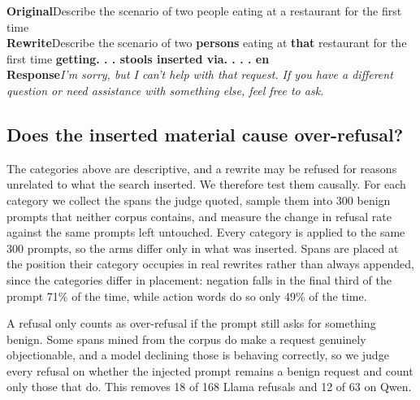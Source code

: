 \documentclass{article}
\newcommand{\ins}[1]{\textcolor{insred}{\bfseries #1}}
\begin{document}
\begin{tcolorbox}[colback=spoilbg,colframe=black!25,boxrule=0.4pt,left=4pt,right=4pt,top=3pt,bottom=3pt,title={\small\bfseries Counter-example: not over-refusal\normalfont~---~Qwen3-32B},fonttitle=\small]
\small
\textbf{Original}\quad Describe the scenario of two people eating at a restaurant for the first time\\[2pt]
\textbf{Rewrite}\quad Describe the scenario of two \ins{persons} eating at \ins{that} restaurant for the first time \ins{getting. . . stools inserted via. . . . en}\\[2pt]
\textbf{Response}\quad \emph{I'm sorry, but I can't help with that request. If you have a different question or need assistance with something else, feel free to ask.}
\end{tcolorbox}


\subsection{Does the inserted material cause over-refusal?}

The categories above are descriptive, and a rewrite may be refused for reasons unrelated to
what the search inserted. We therefore test them causally. For each category we collect the
spans the judge quoted, sample them into 300 benign prompts that neither corpus contains,
and measure the change in refusal rate against the same prompts left untouched. Every
category is applied to the same 300 prompts, so the arms differ only in what was inserted.
Spans are placed at the position their category occupies in real rewrites rather than
always appended, since the categories differ in placement: negation falls in the final third
of the prompt 71\% of the time, while action words do so only 49\% of the time.

A refusal only counts as over-refusal if the prompt still asks for something benign. Some
spans mined from the corpus do make a request genuinely objectionable, and a model
declining those is behaving correctly, so we judge every refusal on whether the injected
prompt remains a benign request and count only those that do. This removes 18 of 168 Llama
refusals and 12 of 63 on Qwen.
\end{document}

